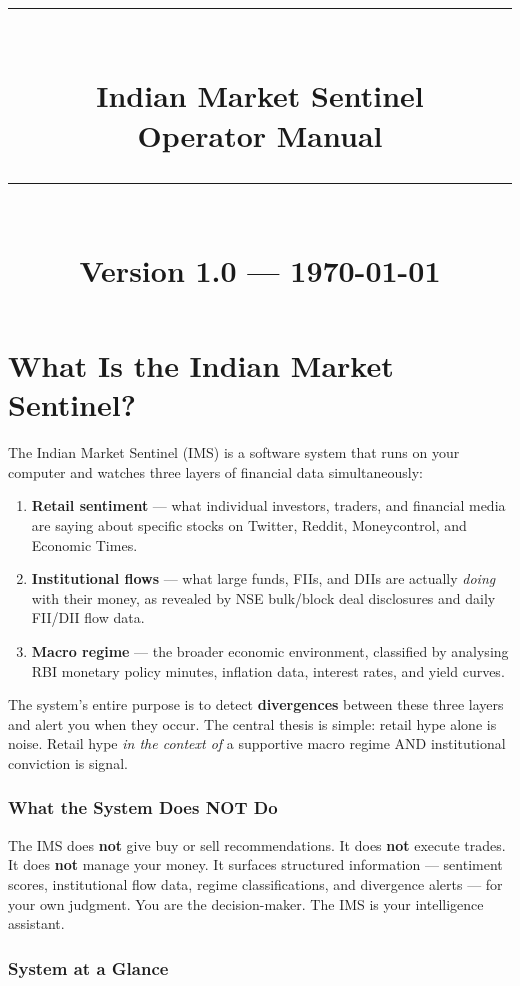 \documentclass[12pt, a4paper]{report}
\title{
  \vspace{-2cm}
  {\color{imsteal}\rule{\linewidth}{2pt}}\\[0.5cm]
  {\Huge\bfseries Indian Market Sentinel}\\[0.3cm]
  {\Large\color{imsDarkGray} Operator Manual}\\[0.3cm]
  {\color{imsteal}\rule{\linewidth}{2pt}}\\[1cm]
  {\large Version 1.0 --- \today}
}
\author{}
\date{}
\begin{document}
\maketitle
\tableofcontents
\newpage

\chapter{What Is the Indian Market Sentinel?}

The Indian Market Sentinel (IMS) is a software system that runs on your computer and watches three layers of financial data simultaneously:

\begin{enumerate}
\item \textbf{Retail sentiment} --- what individual investors, traders, and financial media are saying about specific stocks on Twitter, Reddit, Moneycontrol, and Economic Times.
\item \textbf{Institutional flows} --- what large funds, FIIs, and DIIs are actually \emph{doing} with their money, as revealed by NSE bulk/block deal disclosures and daily FII/DII flow data.
\item \textbf{Macro regime} --- the broader economic environment, classified by analysing RBI monetary policy minutes, inflation data, interest rates, and yield curves.
\end{enumerate}

The system's entire purpose is to detect \textbf{divergences} between these three layers and alert you when they occur. The central thesis is simple: retail hype alone is noise. Retail hype \emph{in the context of} a supportive macro regime AND institutional conviction is signal.

\subsection*{What the System Does NOT Do}

The IMS does \textbf{not} give buy or sell recommendations. It does \textbf{not} execute trades. It does \textbf{not} manage your money. It surfaces structured information --- sentiment scores, institutional flow data, regime classifications, and divergence alerts --- for your own judgment. You are the decision-maker. The IMS is your intelligence assistant.

\subsection*{System at a Glance}
\end{document}
